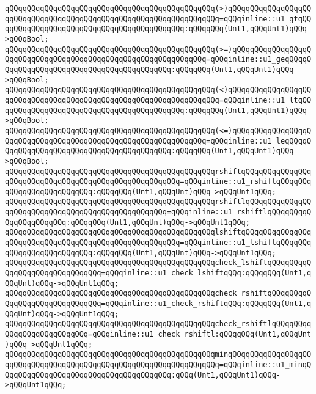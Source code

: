 \verb|qQQqqQQqqQQqqQQqqQQqqQQqqQQqqQQqqQQqqQQqqQQqqQQq(>)qQQqqQQqqQQqqQQqqQQqqQQqqQQqqQQqqQQqqQQqqQQqqQQqqQQqqQQqqQQqqQQqqQQq=qQQqinline::u1_gtqQQqqQQqqQQqqQQqqQQqqQQqqQQqqQQqqQQqqQQqqQQq:qQQqqQQq(Unt1,qQQqUnt1)qQQq->qQQqBool;|\newline
\verb|qQQqqQQqqQQqqQQqqQQqqQQqqQQqqQQqqQQqqQQqqQQqqQQq(>=)qQQqqQQqqQQqqQQqqQQqqQQqqQQqqQQqqQQqqQQqqQQqqQQqqQQqqQQqqQQqqQQq=qQQqinline::u1_geqQQqqQQqqQQqqQQqqQQqqQQqqQQqqQQqqQQqqQQqqQQq:qQQqqQQq(Unt1,qQQqUnt1)qQQq->qQQqBool;|\newline
\verb|qQQqqQQqqQQqqQQqqQQqqQQqqQQqqQQqqQQqqQQqqQQqqQQq(<)qQQqqQQqqQQqqQQqqQQqqQQqqQQqqQQqqQQqqQQqqQQqqQQqqQQqqQQqqQQqqQQqqQQq=qQQqinline::u1_ltqQQqqQQqqQQqqQQqqQQqqQQqqQQqqQQqqQQqqQQqqQQq:qQQqqQQq(Unt1,qQQqUnt1)qQQq->qQQqBool;|\newline
\verb|qQQqqQQqqQQqqQQqqQQqqQQqqQQqqQQqqQQqqQQqqQQqqQQq(<=)qQQqqQQqqQQqqQQqqQQqqQQqqQQqqQQqqQQqqQQqqQQqqQQqqQQqqQQqqQQqqQQq=qQQqinline::u1_leqQQqqQQqqQQqqQQqqQQqqQQqqQQqqQQqqQQqqQQqqQQq:qQQqqQQq(Unt1,qQQqUnt1)qQQq->qQQqBool;|\newline
\verb|qQQqqQQqqQQqqQQqqQQqqQQqqQQqqQQqqQQqqQQqqQQqqQQqrshiftqQQqqQQqqQQqqQQqqQQqqQQqqQQqqQQqqQQqqQQqqQQqqQQqqQQqqQQq=qQQqinline::u1_rshiftqQQqqQQqqQQqqQQqqQQqqQQqqQQq:qQQqqQQq(Unt1,qQQqUnt)qQQq->qQQqUnt1qQQq;|\newline
\verb|qQQqqQQqqQQqqQQqqQQqqQQqqQQqqQQqqQQqqQQqqQQqqQQqrshiftlqQQqqQQqqQQqqQQqqQQqqQQqqQQqqQQqqQQqqQQqqQQqqQQqqQQq=qQQqinline::u1_rshiftlqQQqqQQqqQQqqQQqqQQqqQQq:qQQqqQQq(Unt1,qQQqUnt)qQQq->qQQqUnt1qQQq;|\newline
\verb|qQQqqQQqqQQqqQQqqQQqqQQqqQQqqQQqqQQqqQQqqQQqqQQqlshiftqQQqqQQqqQQqqQQqqQQqqQQqqQQqqQQqqQQqqQQqqQQqqQQqqQQqqQQq=qQQqinline::u1_lshiftqQQqqQQqqQQqqQQqqQQqqQQqqQQq:qQQqqQQq(Unt1,qQQqUnt)qQQq->qQQqUnt1qQQq;|\newline
\verb|qQQqqQQqqQQqqQQqqQQqqQQqqQQqqQQqqQQqqQQqqQQqqQQqcheck_lshiftqQQqqQQqqQQqqQQqqQQqqQQqqQQqqQQq=qQQqinline::u1_check_lshiftqQQq:qQQqqQQq(Unt1,qQQqUnt)qQQq->qQQqUnt1qQQq;|\newline
\verb|qQQqqQQqqQQqqQQqqQQqqQQqqQQqqQQqqQQqqQQqqQQqqQQqcheck_rshiftqQQqqQQqqQQqqQQqqQQqqQQqqQQqqQQq=qQQqinline::u1_check_rshiftqQQq:qQQqqQQq(Unt1,qQQqUnt)qQQq->qQQqUnt1qQQq;|\newline
\verb|qQQqqQQqqQQqqQQqqQQqqQQqqQQqqQQqqQQqqQQqqQQqqQQqcheck_rshiftlqQQqqQQqqQQqqQQqqQQqqQQqqQQq=qQQqinline::u1_check_rshiftl:qQQqqQQq(Unt1,qQQqUnt)qQQq->qQQqUnt1qQQq;|\newline
\newline
\verb|qQQqqQQqqQQqqQQqqQQqqQQqqQQqqQQqqQQqqQQqqQQqqQQqminqQQqqQQqqQQqqQQqqQQqqQQqqQQqqQQqqQQqqQQqqQQqqQQqqQQqqQQqqQQqqQQqqQQq=qQQqinline::u1_minqQQqqQQqqQQqqQQqqQQqqQQqqQQqqQQqqQQqqQQq:qQQq(Unt1,qQQqUnt1)qQQq->qQQqUnt1qQQq;|\newline
